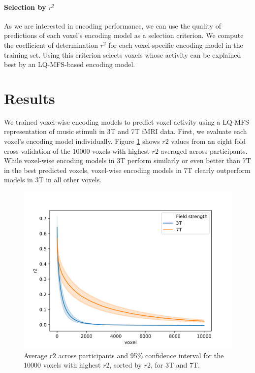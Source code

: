 \paragraph{Selection by $r^2$}

As we are interested in encoding performance, we can use the quality of
predictions of each voxel's encoding model as a selection criterion. We compute
the coefficient of determination $r^2$ for each voxel-specific encoding model
in the training set. Using this criterion selects voxels whose activity can be
explained best by an LQ-MFS-based encoding model.

\section*{Results}

We trained voxel-wise encoding models to predict voxel activity using a LQ-MFS
representation of music stimuli in 3T and 7T f{MRI} data.
First, we evaluate each voxel's encoding model individually.
Figure \ref{fig:r2_plot} shows $r2$ values from an eight fold cross-validation
of the 10000 voxels with highest $r2$ averaged across participants.
While voxel-wise encoding models in 3T perform similarly or even better than 7T
in the best predicted voxels, voxel-wise encoding models in 7T clearly
outperform models in 3T in all other voxels.

\begin{figure}
  \centering
  \includegraphics[width=\linewidth]{pics/r2_plot.pdf}
	
  \caption{Average $r2$ across participants and 95\% confidence interval for the 10000 voxels with
    highest $r2$, sorted by $r2$, for 3T and 7T.
  }

 \label{fig:r2_plot}\end{figure}


